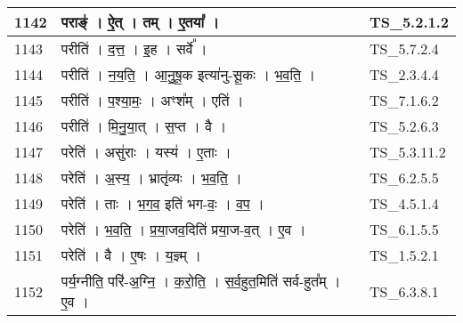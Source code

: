 \documentclass[17pt]{extarticle}
\begin{document}
\begin{longtable}{||p{0.4in}||p{4.9in}||p{0.9in}||}
    \hline
        
    1142 & पराङ्॑   ।   ऐ॒त्   ।   तम्   ।   ए॒तया᳚   ।    & TS\_5.2.1.2       \\
    
    \hline
        
    1143 & परीति॑   ।   द॒त्त॒   ।   इ॒ह   ।   सर्वे᳚   ।    & TS\_5.7.2.4       \\
    
    \hline
        
    1144 & परीति॑   ।   न॒य॒ति॒   ।   आ॒नु॒षू॒क इत्या॑नु{-}सू॒कः   ।   भ॒व॒ति॒   ।    & TS\_2.3.4.4       \\
    
    \hline
        
    1145 & परीति॑   ।   प॒श्या॒मः॒   ।   अꣳश᳚म्   ।   एति॑   ।    & TS\_7.1.6.2       \\
    
    \hline
        
    1146 & परीति॑   ।   मि॒नु॒या॒त्   ।   स॒प्त   ।   वै   ।    & TS\_5.2.6.3       \\
    
    \hline
        
    1147 & परेति॑   ।   असु॑राः   ।   यस्य॑   ।   ए॒ताः   ।    & TS\_5.3.11.2       \\
    
    \hline
        
    1148 & परेति॑   ।   अ॒स्य॒   ।   भ्रातृ॑व्यः   ।   भ॒व॒ति॒   ।    & TS\_6.2.5.5       \\
    
    \hline
        
    1149 & परेति॑   ।   ताः   ।   भ॒ग॒व॒ इति॑ भग{-}वः॒   ।   व॒प॒   ।    & TS\_4.5.1.4       \\
    
    \hline
        
    1150 & परेति॑   ।   भ॒व॒ति॒   ।   प्र॒या॒जव॒दिति॑ प्रया॒ज{-}व॒त्   ।   ए॒व   ।    & TS\_6.1.5.5       \\
    
    \hline
        
    1151 & परेति॑   ।   वै   ।   ए॒षः   ।   य॒ज्ञ्म्   ।    & TS\_1.5.2.1       \\
    
    \hline
        
    1152 & पर्य॒ग्नीति॒ परि॑{-}अ॒ग्नि॒   ।   क॒रो॒ति॒   ।   स॒र्व॒हुत॒मिति॑ सर्व{-}हुत᳚म्   ।   ए॒व   ।    & TS\_6.3.8.1       \\
    

\end{longtable}
\end{document}

